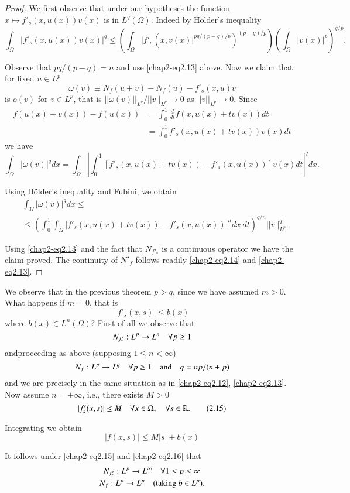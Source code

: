 \begin{proof}
We first observe that under our hypotheses the function $x\mapsto
f'_{s}(x,u(x))v(x)$ is in $L^{q}(\Omega)$. Indeed by H\"older's
inequality
$$
\int_{\Omega}|f'_{s}(x,u(x))v(x)|^{q}\leq
\left(\int_{\Omega}|f'_{s}(x,v(x)|^{pq/(p-q)/p})^{(p-q)/p}\right)\left(\int_{\Omega}|v(x)|^{p}\right)^{q/p}.
$$

Observe that $pq/(p-q)=n$ and use \eqref{chap2-eq2.13} above. Now we
claim that for fixed $u\in L^{p}$
$$
\omega(v)\equiv N_{f}(u+v)-N_{f}(u)-f'_{s}(x,u)v
$$
is $o(v)$ for $v\in L^{p}$, that is
$||\omega(v)||_{L^{q}}/||v||_{L^{p}}\to 0$ as $||v||_{L^{p}}\to
0$. Since
\begin{align*}
f(u(x)+v(x))-f(u(x)) &= \int^{1}_{0}\frac{d}{dt}f(x,u(x)+tv(x))dt\\
&= \int^{1}_{0}f'_{s}(x,u(x)+tv(x))v(x)dt
\end{align*}
we have
$$
\int_{\Omega}|\omega(v)|^{q}dx=\int_{\Omega}|\int^{1}_{0}[f'_{s}(x,u(x)+tv(x))-f'_{s}(x,u(x))]v(x)dt|^{q}dx. 
$$

Using H\"older's inequality and Fubini, we obtain
\begin{align*}
& \int_{\Omega}|\omega(v)|^{q}dx\leq\\
& \leq
  \left(\int^{1}_{0}\int_{\Omega}|f'_{s}(x,u(x)+tv(x))-f'_{s}(x,u(x))|^{n}dx\ dt\right)^{q/n}||v||^{q}_{L^{p}}. 
\end{align*}

Using \eqref{chap2-eq2.13} and the fact that $N_{f'_{*}}$ is a
continuous operator we have the claim proved. The continuity of
$N'_{f}$ follows readily \eqref{chap2-eq2.14} and
\eqref{chap2-eq2.13}. 
\end{proof}

\begin{remark*}
We observe that in the previous theorem $p>q$, since we have assumed
$m>0$. What happens if $m=0$, that is
$$
|f'_{s}(x,s)|\leq b(x)
$$
where $b(x)\in L^{n}(\Omega)$? First of all we observe that
$$
N_{f'_{*}}:L^{p}\to L^{n}\quad \forall p\geq 1
$$
and\pageoriginale proceeding as above (supposing $1\leq n<\infty$)
$$
N_{f}:L^{p}\to L^{q}\quad\forall p\geq 1\quad\text{and}\quad q=np/(n+p)
$$
and we are precisely in the same situation as in \eqref{chap2-eq2.12},
\eqref{chap2-eq2.13}. Now assume $n=+\infty$, i.e., there exists $M>0$
\begin{equation*}
|f'_{s}(x,s)|\leq M\quad\forall x\in \Omega,\quad \forall s\in
\mathbb{R}.\tag{2.15}\label{chap2-eq2.15} 
\end{equation*}

Integrating we obtain
\begin{equation*}
|f(x,s)|\leq M|s|+b(x)\tag{2.16}\label{chap2-eq2.16}
\end{equation*}

It follows under \eqref{chap2-eq2.15} and \eqref{chap2-eq2.16} that
\begin{gather*}
N_{f'_{*}}:L^{p}\to L^{\infty}\quad \forall 1\leq p\leq \infty\\
N_{f}:L^{p}\to L^{p}\quad (\text{taking}~ b\in L^{p}).
\end{gather*}
\end{remark*}

